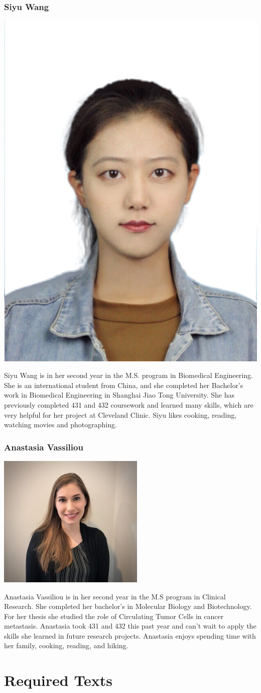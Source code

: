 \documentclass[
]{book}
\begin{document}
\hypertarget{siyu-wang}{%
\subsection{Siyu Wang}\label{siyu-wang}}

\includegraphics[width=0.2\linewidth]{images/Siyu_Wang}

Siyu Wang is in her second year in the M.S. program in Biomedical Engineering. She is an international student from China, and she completed her Bachelor's work in Biomedical Engineering in Shanghai Jiao Tong University. She has previously completed 431 and 432 coursework and learned many skills, which are very helpful for her project at Cleveland Clinic. Siyu likes cooking, reading, watching movies and photographing.

\hypertarget{anastasia-vassiliou}{%
\subsection{Anastasia Vassiliou}\label{anastasia-vassiliou}}

\includegraphics[width=0.2\linewidth]{images/Anastasia_Vassiliou}

Anastasia Vassiliou is in her second year in the M.S program in Clinical Research. She completed her bachelor's in Molecular Biology and Biotechnology. For her thesis she studied the role of Circulating Tumor Cells in cancer metastasis. Anastasia took 431 and 432 this past year and can't wait to apply the skills she learned in future research projects. Anastasia enjoys spending time with her family, cooking, reading, and hiking.

\hypertarget{required-texts}{%
\chapter{Required Texts}\label{required-texts}}
\end{document}
